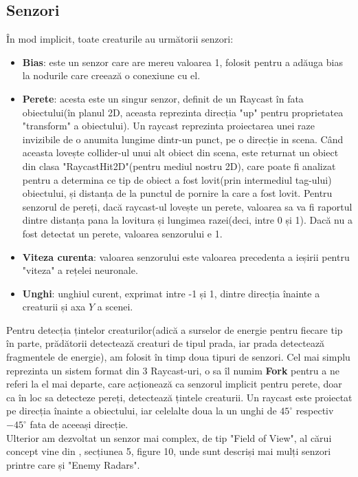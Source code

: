 \subsection*{Senzori}\label{Senzori}
În mod implicit, toate creaturile au următorii senzori:
\begin{itemize}
    \item \textbf{Bias}: este un senzor care are mereu valoarea 1, folosit pentru a adăuga bias la nodurile care creează o conexiune cu el.
    \item \textbf{Perete}: acesta este un singur senzor, definit de un Raycast în fata obiectului(în planul 2D, aceasta reprezinta direcția "up" pentru proprietatea "transform" a obiectului). 
    Un raycast reprezinta proiectarea unei raze invizibile de o anumita lungime dintr-un punct, pe o direcție in scena.
    Când aceasta lovește collider-ul unui alt obiect din scena, este returnat un obiect din clasa "RaycastHit2D"(pentru mediul nostru 2D), care poate fi analizat pentru a determina ce tip de obiect a fost lovit(prin intermediul tag-ului) obiectului, și distanța de la punctul de pornire la care a fost lovit.
    Pentru senzorul de pereți, dacă raycast-ul lovește un perete, valoarea sa va fi raportul dintre distanța pana la lovitura și lungimea razei(deci, intre 0 și 1). Dacă nu a fost detectat un perete, valoarea senzorului e 1.  
    \item \textbf{Viteza curenta}: valoarea senzorului este valoarea precedenta a ieșirii pentru "viteza" a rețelei neuronale.
    \item \textbf{Unghi}: unghiul curent, exprimat intre -1 și 1, dintre direcția înainte a creaturii și axa $Y$ a scenei.
\end{itemize}
Pentru detecția țintelor creaturilor(adică a surselor de energie pentru fiecare tip în parte, prădătorii detectează creaturi de tipul prada, iar prada detectează fragmentele de energie), am folosit în timp doua tipuri de senzori.
Cel mai simplu reprezinta un sistem format din 3 Raycast-uri, o sa îl numim \textbf{Fork} pentru a ne referi la el mai departe, care acționează ca senzorul implicit pentru perete, doar ca în loc sa detecteze pereți, detectează țintele creaturii.
Un raycast este proiectat pe direcția înainte a obiectului, iar celelalte doua la un unghi de $45^{\circ}$ respectiv $-45^{\circ}$ fata de aceeași direcție.
\\
Ulterior am dezvoltat un senzor mai complex, de tip "Field of View", al cărui concept vine din \cite{rtNEAT}, secțiunea 5, figure 10, unde sunt descriși mai mulți senzori printre care și "Enemy Radars".
